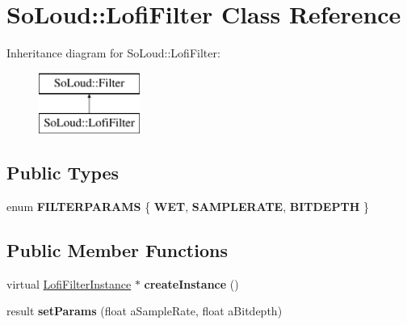 \hypertarget{class_so_loud_1_1_lofi_filter}{}\section{So\+Loud\+:\+:Lofi\+Filter Class Reference}
\label{class_so_loud_1_1_lofi_filter}
Inheritance diagram for So\+Loud\+:\+:Lofi\+Filter\+:\begin{figure}[H]
\begin{center}
\leavevmode
\includegraphics[height=2.000000cm]{class_so_loud_1_1_lofi_filter}
\end{center}
\end{figure}
\subsection*{Public Types}
\begin{DoxyCompactItemize}
\item 
\mbox{\label{class_so_loud_1_1_lofi_filter_a628a6ed55f2e6b27b656c84deb1bf242}} 
enum {\bfseries F\+I\+L\+T\+E\+R\+P\+A\+R\+A\+MS} \{ {\bfseries W\+ET}, 
{\bfseries S\+A\+M\+P\+L\+E\+R\+A\+TE}, 
{\bfseries B\+I\+T\+D\+E\+P\+TH}
 \}
\end{DoxyCompactItemize}
\subsection*{Public Member Functions}
\begin{DoxyCompactItemize}
\item 
\mbox{\label{class_so_loud_1_1_lofi_filter_a0b7484ec8d440c34a787514a838d17f0}} 
virtual \mbox{\hyperlink{class_so_loud_1_1_lofi_filter_instance}{Lofi\+Filter\+Instance}} $\ast$ {\bfseries create\+Instance} ()
\item 
\mbox{\label{class_so_loud_1_1_lofi_filter_a08192a6e28088cf78518c684dba2e6eb}} 
result {\bfseries set\+Params} (float a\+Sample\+Rate, float a\+Bitdepth)
\end{DoxyCompactItemize}
